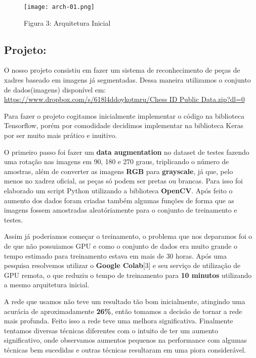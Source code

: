 \begin{figure}[ht]
\centering
\texttt{[image: arch-01.png]}
\caption{Figura 3: Arquitetura Inicial}
\end{figure}


    \subsection{Projeto:}\label{projeto}

O nosso projeto consistiu em fazer um sistema de reconhecimento de peças
de xadres baseado em imagens já segmentadas. Dessa maneira utilizamos o
conjunto de dados(imagens) disponível em:
\href{https://www.dropbox.com/s/618l4ddoykotmru/Chess\%20ID\%20Public\%20Data.zip?dl=0}{
https://www.dropbox.com/s/618l4ddoykotmru/Chess ID Public Data.zip?dl=0}

Para fazer o projeto cogitamos inicialmente implementar o código na
biblioteca Tensorflow, porém por comodidade decidimos implementar na
biblioteca Keras por ser muito mais prático e inuitivo.

O primeiro passo foi fazer um \textbf{data augmentation} no dataset de
testes fazendo uma rotação nas imagens em 90, 180 e 270 graus,
triplicando o número de amostras, além de converter as imagens
\textbf{RGB} para \textbf{grayscale}, já que, pelo menos no xadrez
oficial, as peças só podem ser pretas ou brancas. Para isso foi
elaborado um script Python utilizando a biblioteca \textbf{OpenCV}. Após
feito o aumento dos dados foram criadas também algumas funções de forma
que as imagens fossem amostradas aleatóriamente para o conjunto de
treinamento e testes.

Assim já poderiamos começar o treinamento, o problema que nos deparamos
foi o de que não possuiamos GPU e como o conjunto de dados era muito
grande o tempo estimado para treinamento estava em mais de 30 horas.
Após uma pesquisa resolvemos utilizar o \textbf{Google Colab}[3] e seu
serviço de utilização de GPU remota, o que reduziu o tempo de
treinamento para \textbf{10 minutos} utilizando a mesmo arquitetura
inicial.

A rede que usamos não teve um resultado tão bom inicialmente, atingindo uma
acurácia de aproximadamente \textbf{26\%}, então tomamos a decisão de tornar a
rede mais profunda. Feito isso a rede teve uma melhora significativa.
Finalmente tentamos diversas técnicas diferentes com o intuito de ter um aumento
significativo, onde observamos aumentos pequenos na performance com algumas
técnicas bem sucedidas e outras técnicas resultaram em uma piora considerável.

